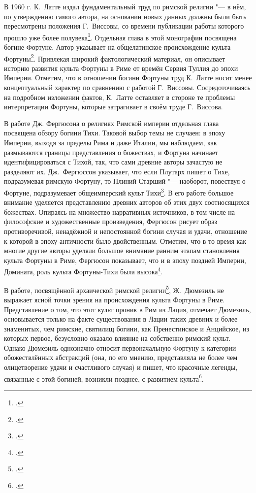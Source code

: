 
В 1960 г. К.~Латте издал фундаментальный труд по римской религии "--- в нём, по утверждению самого автора, на основании новых данных должны были быть пересмотрены положения Г.~Виссовы, со времени публикации работы которого прошло уже более полувека\footcite[S. VII]{Latte1960}. Отдельная глава в этой монографии посвящена богине Фортуне. Автор указывает на общелатинское происхождение культа Фортуны\footcite[S. 178]{Latte1960}. Привлекая широкий фактологический материал, он описывает историю развития культа Фортуны в Риме от времён Сервия Туллия до эпохи Империи. Отметим, что в отношении богини Фортуны труд К.~Латте носит менее концептуальный характер по сравнению с работой Г.~Виссовы. Сосредоточиваясь на подробном изложении фактов, К.~Латте оставляет в стороне те проблемы интерпретации Фортуны, которые затрагивает в своём труде Г.~Виссова.


В работе Дж. Фергюсона о религиях Римской империи отдельная глава посвящена обзору богини Тихи. Таковой выбор темы не случаен: в эпоху Империи, выходя за пределы Рима и даже Италии, мы наблюдаем, как размываются границы представления о божествах, и Фортуна начинает идентифицироваться с Тихой, так, что сами древние авторы зачастую не разделяют их. Дж.~Фергюссон указывает, что если Плутарх пишет о Тихе, подразумевая римскую Фортуну, то Плиний Старший "--- наоборот, повествуя о Фортуне, подразумевает общеимперский культ Тихи\footcite[P. 79]{Ferguson1970}. В его работе большое внимание уделяется представлению древних авторов об этих двух соотносящихся божествах. Опираясь на множество нарративных источников, в том числе на философские и художественные произведения, Фергюсон рисует образ противоречивой, ненадёжной и непостоянной богини случая и удачи, отношение к которой в эпоху античности было двойственным. Отметим, что в то время как многие другие авторы уделяли большое внимание ранним этапам становления культа Фортуны в Риме, Фергюсон показывает, что и в эпоху поздней Империи, Домината, роль культа Фортуны-Тихи была высока\footcite[P. 86--87]{Ferguson1970}. 


В работе, посвящённой архаической римской религии\footcite{Dumezil1974}, Ж.~Дюмезиль не выражает ясной точки зрения на происхождения культа Фортуны в Риме. Представление о том, что этот культ проник в Рим из Лация, отмечает Дюмезиль, основывается только на факте существования в Лации таких древних и более знаменитых, чем римские, святилищ богини, как Пренестинское и Анцийское, из которых первое, безусловно оказало влияние на собственно римский культ. Однако Дюмезиль однозначно относит первоначальную Фортуну к категории обожествлённых абстракций (она, по его мнению, представляла не более чем олицетворение удачи и счастливого случая) и пишет, что красочные легенды, связанные с этой богиней, возникли позднее, с развитием культа\footcite[P. 424.]{Dumezil1974}.

